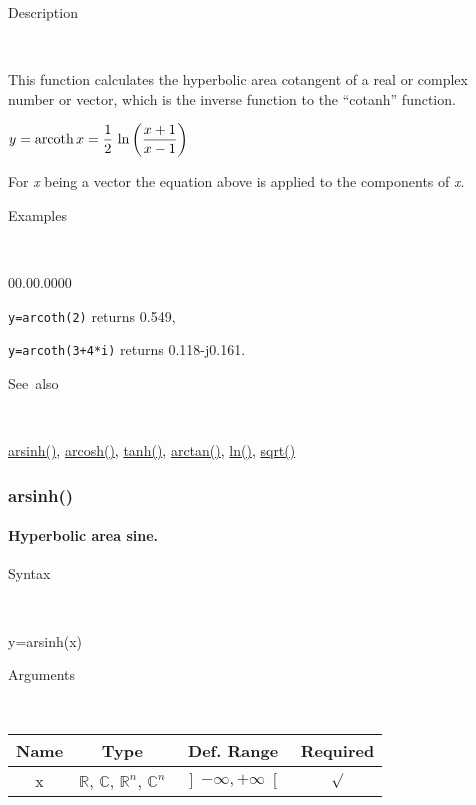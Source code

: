 \begin{description}
\item [Description]~
\end{description}
This function calculates the hyperbolic area cotangent of a real or
complex number or vector, which is the inverse function to the {}``cotanh''
function.

\medskip{}
$y=\textrm{arcoth\,}x={\displaystyle \frac{1}{2}\,\ln\left(\frac{x+1}{x-1}\right)}$ 
\medskip{}

\noindent For \textit{x} being a vector the equation above is applied
to the components of \textit{x}.

\begin{description}
\item [Examples]~
\end{description}
\begin{lyxlist}{00.00.0000}
\item [\texttt{y=arcoth(2)}]returns 0.549,
\item [\texttt{y=arcoth(3+4{*}i)}]returns 0.118-j0.161.
\end{lyxlist}
\begin{description}
\item [See~also]~
\end{description}
\textcolor{blue}{\hyperlink{arsinh}{arsinh()}}\textcolor{black}{,}
\textcolor{blue}{\hyperlink{arcosh}{arcosh()}}\textcolor{black}{,}
\textcolor{blue}{\hyperlink{tanh}{tanh()}}\textcolor{black}{,} \textcolor{blue}{\hyperlink{arctan}{arctan()}}\textcolor{black}{,}
\textcolor{blue}{\hyperlink{ln}{ln()}}\textcolor{black}{,} \textcolor{blue}{\hyperlink{sqrt}{sqrt()}}


\newpage
\subsubsection*{\hypertarget{arsinh}{}{\Large arsinh()}}


\paragraph{\label{par:Hyperbolic-area-sine}Hyperbolic area sine.}

\begin{description}
\item [Syntax]~
\end{description}
y=arsinh(x)

\begin{description}
\item [Arguments]~
\end{description}
\begin{tabular}{|c|c|c|c|}
\hline 
Name&
Type&
Def. Range&
Required\tabularnewline
\hline
\hline 
x&
$\mathbb{R}$, $\mathbb{C}$, $\mathbb{R}^{n}$, $\mathbb{C}^{n}$&
$\left]-\infty,+\infty\right[$&
$\surd$\tabularnewline
\hline
\end{tabular}

